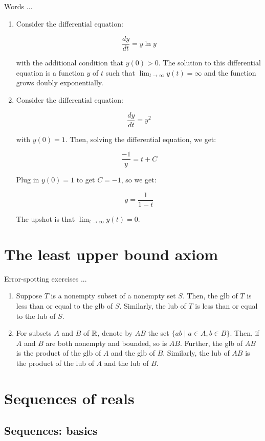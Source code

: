 \documentclass[10pt]{amsart}
\begin{document}
Words ...

\begin{enumerate}
\item Consider the differential equation:

  $$\frac{dy}{dt} = y \ln y$$

  with the additional condition that $y(0) > 0$. The solution to this
  differential equation is a function $y$ of $t$ such that $\lim_{t
  \to \infty} y(t) = \infty$ and the function grows doubly
  exponentially.
\item Consider the differential equation:

  $$\frac{dy}{dt}= y^2$$

  with $y(0) = 1$. Then, solving the differential equation, we get:

  $$\frac{-1}{y} = t + C$$

  Plug in $y(0) = 1$ to get $C = -1$, so we get:

  $$y = \frac{1}{1 - t}$$

  The upshot is that $\lim_{t \to \infty} y(t) = 0$.

\end{enumerate}

\section{The least upper bound axiom}

Error-spotting exercises ...

\begin{enumerate}
\item Suppose $T$ is a nonempty subset of a nonempty set $S$. Then,
  the glb of $T$ is less than or equal to the glb of $S$. Similarly, the
  lub of $T$ is less than or equal to the lub of $S$.
\item For subsets $A$ and $B$ of $\mathbb{R}$, denote by $AB$ the set $\{ ab
  \mid a \in A, b \in B \}$. Then, if $A$ and $B$ are both nonempty
  and bounded, so is $AB$. Further, the glb of $AB$ is the product of
  the glb of $A$ and the glb of $B$. Similarly, the lub of $AB$ is the
  product of the lub of $A$ and the lub of $B$.
\end{enumerate}

\section{Sequences of reals}

\subsection{Sequences: basics}
\end{document}
